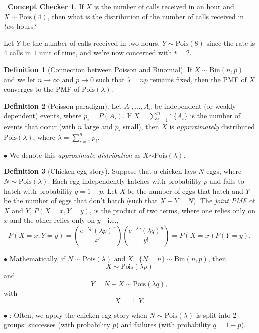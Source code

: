 \documentclass[12pt,oneside]{article}
\newcommand{\indep}{\perp\!\!\!\perp}
\newcommand{\Bin}{\text{Bin}}
\newcommand{\Pois}{\text{Pois}}
\newcommand{\simapprox}{\overset{\cdot}{\sim}}
\newcommand{\indic}{\mathds{1}}
\newcommand{\tip}{\textbf{\faLightbulb}: }
\theoremstyle{definition}
\newtheorem{definition}{Definition}
\newtheorem{concept}{\faPen \ Concept Checker}
\theoremstyle{remark}
\begin{document}
\begin{concept}
If $X$ is the number of calls received in an hour and $X \sim \Pois(4)$, then what is the distribution of the number of calls received in \textit{two} hours?
\end{concept}

\begin{solutionbox}
Let $Y$ be the number of calls received in two hours. $Y \sim \Pois(8)$ since the rate is $4$ calls in $1$ unit of time, and we're now concerned with $t = 2$.
\end{solutionbox}

\begin{definition}[Connection between Poisson and Binomial]
If $X \sim \Bin(n, p)$ and we let $n \rightarrow \infty$ and $p \rightarrow 0$ such that $\lambda = np$ remains fixed, then the PMF of $X$ converges to the PMF of $\Pois(\lambda)$.
\end{definition}

\begin{definition}[Poisson paradigm]
Let $A_1, \ldots, A_n$ be independent (or weakly dependent) events, where $p_i = P(A_i)$. If $X = \sum_{i = 1}^{n} \indic\{A_i\}$ is the number of events that occur (with $n$ large and $p_i$ small), then $X$ is \textit{approximately} distributed $\Pois(\lambda)$, where $\lambda = \sum_{i = 1}^{n} p_i$.

$\bullet$ We denote this \textit{approximate distribution} as $X \simapprox \Pois(\lambda)$.
\end{definition}

\begin{definition}[Chicken-egg story]
Suppose that a chicken lays $N$ eggs, where $N \sim \Pois(\lambda)$. Each egg independently hatches with probability $p$ and fails to hatch with probability $q = 1 - p$. Let $X$ be the number of eggs that hatch and $Y$ be the number of eggs that don't hatch (such that $X + Y = N$). The \textit{joint PMF} of $X$ and $Y$, $P(X = x, Y = y)$, is the product of two terms, where one relies only on $x$ and the other relies only on $y$—i.e., \[P(X = x, Y = y) = \left( \frac{e^{- \lambda p} (\lambda p)^x}{x!} \right) \left( \frac{e^{- \lambda q} (\lambda q)^y}{y!} \right) = P(X = x) P(Y = y).\]

$\bullet$ Mathematically, if $N \sim \Pois(\lambda)$ and $X \mid \{N = n\} \sim \Bin(n, p)$, then \[X \sim \Pois(\lambda p)\] and \[Y = N - X \sim \Pois(\lambda q),\] with \[X \indep Y.\]

$\bullet$ \tip Often, we apply the chicken-egg story when $N \sim \Pois(\lambda)$ is split into 2 groups: successes (with probability $p$) and failures (with probability $q = 1 - p$).
\end{definition}
\end{document}
